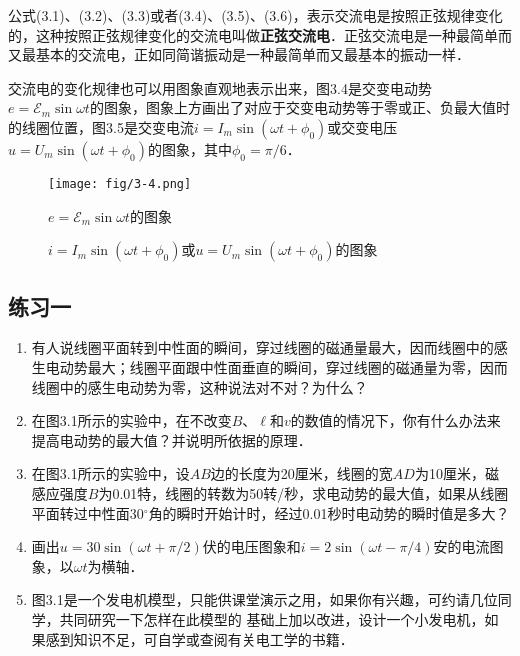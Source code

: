 公式(3.1)、(3.2)、(3.3)或者(3.4)、(3.5)、(3.6)，表示交流电是按照正弦规律变化的，这种按照正弦规律变化的交流电叫做\textbf{正弦交流电}．正弦交流电是一种最简单而又最基本的交流电，正如同简谐振动是一种最简单而又最基本的振动一样．
	
	
交流电的变化规律也可以用图象直观地表示出来，图3.4是交变电动势$e=\mathcal{E}_m \sin \omega t$的图象，图象上方画出了对应于交变电动势等于零或正、负最大值时的线圈位置，图3.5是交变电流$i=I_m\sin(\omega t+\phi_0)$或交变电压 $u=U_m\sin(\omega t+\phi_0)$的图象，其中$\phi_0=\pi/6$．
\begin{figure}[htp]\centering
\texttt{[image: fig/3-4.png]}
\caption{$e=\mathcal{E}_m \sin \omega t$的图象}
\end{figure}
\begin{figure}[htp]\centering
{}
\caption{$i=I_m\sin(\omega t+\phi_0)$或$u=U_m\sin(\omega t+\phi_0)$的图象}
\end{figure}



\subsection*{练习一}
\begin{enumerate}
    \item 有人说线圈平面转到中性面的瞬间，穿过线圈的磁通量最大，因而线圈中的感生电动势最大；线圈平面跟中性面垂直的瞬间，穿过线圈的磁通量为零，因而线圈中的感生电动势为零，这种说法对不对？为什么？
    \item 在图3.1所示的实验中，在不改变$B$、$\ell$和$v$的数值的情况下，你有什么办法来提高电动势的最大值？并说明所依据的原理．
    \item 在图3.1所示的实验中，设$AB$边的长度为20厘米，线圈的宽$AD$为10厘米，磁感应强度$B$为0.01特，线圈的转数为50转/秒，求电动势的最大值，如果从线圈平面转过中性面30$^\circ$角的瞬时开始计时，经过0.01秒时电动势的瞬时值是多大？
    \item 画出$u=30\sin(\omega t+\pi/2)$伏的电压图象和$i=2\sin(\omega t-\pi/4)$安的电流图象，以$\omega t$为横轴．
    \item 图3.1是一个发电机模型，只能供课堂演示之用，如果你有兴趣，可约请几位同学，共同研究一下怎样在此模型的	
	基础上加以改进，设计一个小发电机，如果感到知识不足，可自学或查阅有关电工学的书籍．
\end{enumerate}


